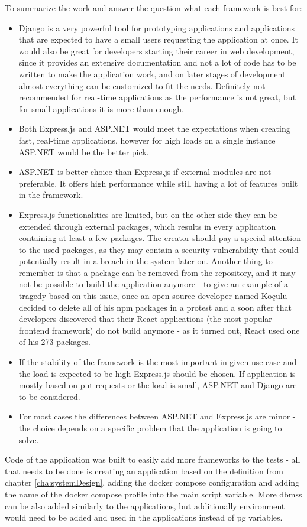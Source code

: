To summarize the work and answer the question what each framework is best for:
\begin{itemize}
    \item Django is a very powerful tool for prototyping applications and applications that are expected to have a small users requesting the application at once. It would also be great for developers starting their career in web development, since it provides an extensive documentation and not a lot of code has to be written to make the application work, and on later stages of development almost everything can be customized to fit the needs. Definitely not recommended for real-time applications as the performance is not great, but for small applications it is more than enough.
    \item Both Express.js and ASP.NET would meet the expectations when creating fast, real-time applications, however for high loads on a single instance ASP.NET would be the better pick.
    \item ASP.NET is better choice than Express.js if external modules are not preferable. It offers high performance while still having a lot of features built in the framework.
    \item Express.js functionalities are limited, but on the other side they can be extended through external packages, which results in every application containing at least a few packages. The creator should pay a special attention to the used packages, as they may contain a security vulnerability that could potentially result in a breach in the system later on. Another thing to remember is that a package can be removed from the repository, and it may not be possible to build the application anymore - to give an example of a tragedy based on this issue, once an open-source developer named Koçulu decided to delete all of his npm packages in a protest and a soon after that developers discovered that their React applications (the most popular frontend framework) do not build anymore - as it turned out, React used one of his 273 packages.
    \item If the stability of the framework is the most important in given use case and the load is expected to be high Express.js should be chosen. If application is mostly based on put requests or the load is small, ASP.NET and Django are to be considered.
    \item For most cases the differences between ASP.NET and Express.js are minor - the choice depends on a specific problem that the application is going to solve.
\end{itemize}

Code of the application was built to easily add more frameworks to the tests - all that needs to be done is creating an application based on the definition from chapter \ref{cha:systemDesign}, adding the docker compose configuration and adding the name of the docker compose profile into the main script variable. More \acrlong{dbms}s can be also added similarly to the applications, but additionally environment would need to be added and used in the applications instead of \acrlong{pg} variables.
